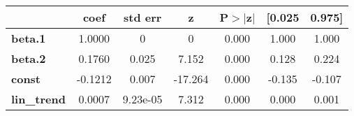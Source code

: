 \begin{center}
\begin{tabular}{lcccccc}
                    & \textbf{coef} & \textbf{std err} & \textbf{z} & \textbf{P$> |$z$|$} & \textbf{[0.025} & \textbf{0.975]}  \\
\midrule
\textbf{beta.1}     &       1.0000  &            0     &         0  &         0.000        &        1.000    &        1.000     \\
\textbf{beta.2}     &       0.1760  &        0.025     &     7.152  &         0.000        &        0.128    &        0.224     \\
\textbf{const}      &      -0.1212  &        0.007     &   -17.264  &         0.000        &       -0.135    &       -0.107     \\
\textbf{lin\_trend} &       0.0007  &     9.23e-05     &     7.312  &         0.000        &        0.000    &        0.001     \\
\bottomrule
\end{tabular}
\end{center}